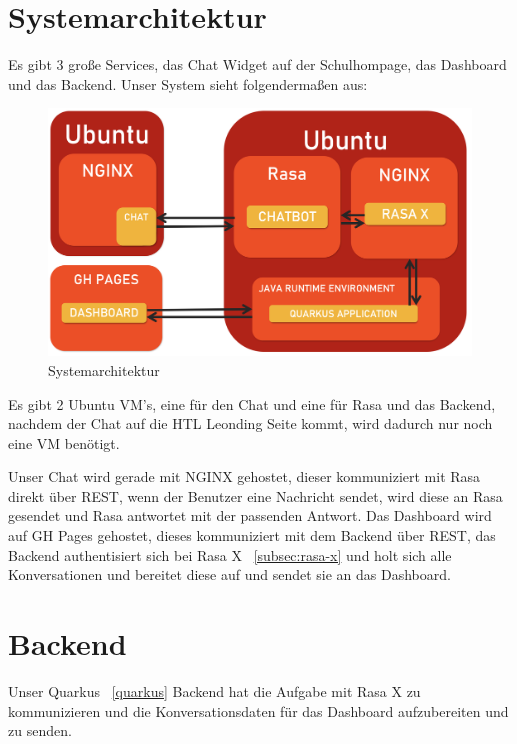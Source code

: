 \section{Systemarchitektur}\label{sec:systemarchitektur}

Es gibt 3 große Services, das Chat Widget auf der Schulhompage, das Dashboard und das Backend.
Unser System sieht folgendermaßen aus:

\begin{figure}[hbt!]
    \centering
    \includegraphics[scale=0.2]{pics/systemarchitektur}
    \caption{Systemarchitektur}
    \label{fig:impl:architektur}
\end{figure}

Es gibt 2 Ubuntu VM's, eine für den Chat und eine für Rasa und das Backend, nachdem der Chat auf die HTL Leonding Seite kommt, wird dadurch nur noch eine VM benötigt.

Unser Chat wird gerade mit NGINX gehostet, dieser kommuniziert mit Rasa direkt über REST, wenn der Benutzer eine Nachricht sendet, wird diese an Rasa gesendet und Rasa antwortet mit der passenden Antwort.
Das Dashboard wird auf GH Pages gehostet, dieses kommuniziert mit dem Backend über REST, das Backend authentisiert sich bei Rasa X ~\ref{subsec:rasa-x} und holt sich alle Konversationen und bereitet diese auf und sendet sie an das Dashboard.

\section{Backend}\label{sec:backend}

Unser Quarkus ~\ref{quarkus} Backend hat die Aufgabe mit Rasa X zu kommunizieren und die Konversationsdaten für das Dashboard aufzubereiten und zu senden.

